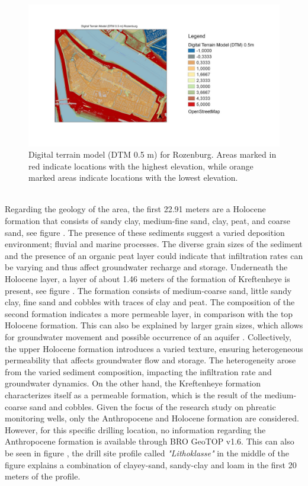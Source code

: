 \begin{figure}[htbp]
    \centering
    \includegraphics[width=0.80\linewidth]{figures/roz/ahnrozfig.pdf}
    \caption{Digital terrain model (DTM 0.5 m) for Rozenburg. Areas marked in red indicate locations with the highest elevation, while orange marked areas indicate locations with the lowest elevation.}
    \label{AHNroz}
\end{figure}\\
Regarding the geology of the area, the first 22.91 meters are a Holocene formation that consists of sandy clay, medium-fine sand, clay, peat, and coarse sand, see figure . The presence of these sediments suggest a varied deposition environment; fluvial and marine processes. The diverse grain sizes of the sediment and the presence of an organic peat layer could indicate that infiltration rates can be varying and thus affect groundwater recharge and storage. Underneath the Holocene layer, a layer of about 1.46 meters of the formation of Kreftenheye is present, see figure . The formation consists of medium-coarse sand, little sandy clay, fine sand and cobbles with traces of clay and peat. The composition of the second formation indicates a more permeable layer, in comparison with the top Holocene formation. This can also be explained by larger grain sizes, which allows for groundwater movement and possible occurrence of an aquifer \cite{janssen-2005}. 
\newpage
\noindent
Collectively, the upper Holocene formation introduces a varied texture, ensuring heterogeneous permeability that affects groundwater flow and storage. The heterogeneity arose from the varied sediment composition, impacting the infiltration rate and groundwater dynamics. On the other hand, the Kreftenheye formation characterizes itself as a permeable formation, which is the result of the medium-coarse sand and cobbles. Given the focus of the research study on phreatic monitoring wells, only the Anthropocene and Holocene formation are considered. However, for this specific drilling location, no information regarding the Anthropocene formation is available through BRO GeoTOP v1.6. This can also be seen in figure , the drill site profile called \textit{"Lithoklasse"} in the middle of the figure explains a combination of clayey-sand, sandy-clay and loam in the first 20 meters of the profile. 

